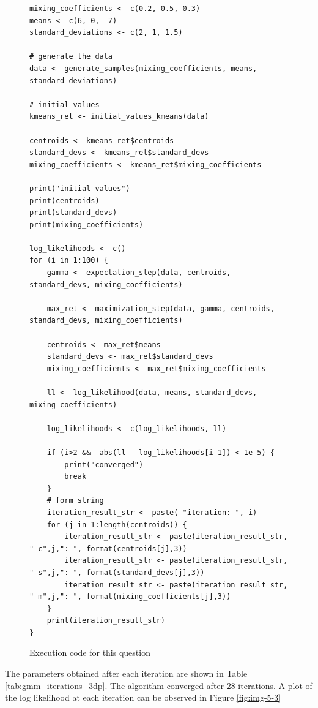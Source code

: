 \documentclass[]{article}
\begin{document}
\begin{figure}[H]
	\captionsetup{type=lstlisting}
	\begin{lstlisting}
mixing_coefficients <- c(0.2, 0.5, 0.3)
means <- c(6, 0, -7)
standard_deviations <- c(2, 1, 1.5)

# generate the data
data <- generate_samples(mixing_coefficients, means, standard_deviations)

# initial values
kmeans_ret <- initial_values_kmeans(data)

centroids <- kmeans_ret$centroids
standard_devs <- kmeans_ret$standard_devs
mixing_coefficients <- kmeans_ret$mixing_coefficients

print("initial values")
print(centroids)
print(standard_devs)
print(mixing_coefficients)

log_likelihoods <- c()
for (i in 1:100) {
	gamma <- expectation_step(data, centroids, standard_devs, mixing_coefficients)
	
	max_ret <- maximization_step(data, gamma, centroids, standard_devs, mixing_coefficients)
	
	centroids <- max_ret$means
	standard_devs <- max_ret$standard_devs
	mixing_coefficients <- max_ret$mixing_coefficients 
	
	ll <- log_likelihood(data, means, standard_devs, mixing_coefficients)
	
	log_likelihoods <- c(log_likelihoods, ll)
	
	if (i>2 &&  abs(ll - log_likelihoods[i-1]) < 1e-5) {
		print("converged")
		break
	}
	# form string
	iteration_result_str <- paste( "iteration: ", i)
	for (j in 1:length(centroids)) {
		iteration_result_str <- paste(iteration_result_str, " c",j,": ", format(centroids[j],3))
		iteration_result_str <- paste(iteration_result_str, " s",j,": ", format(standard_devs[j],3))
		iteration_result_str <- paste(iteration_result_str, " m",j,": ", format(mixing_coefficients[j],3))
	}
	print(iteration_result_str)
}			
		\end{lstlisting}
	\caption{Execution code for this question}
\label{lst:em-exec}
\end{figure}


\noindent The parameters obtained after each iteration are shown in Table \ref{tab:gmm_iterations_3dp}. The algorithm converged after 28 iterations. A plot of the log likelihood at each iteration can be observed in Figure \ref{fig:img-5-3}
\end{document}
